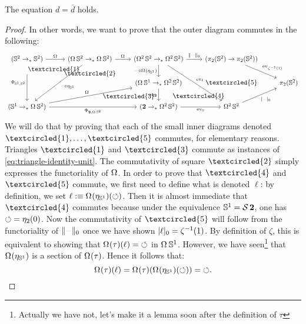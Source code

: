 \documentclass[english,a4]{article}
\newcommand{\ptdto}{\to_\ast}%
\newcommand{\setTrunc}[1]{\Trunc{#1}_0}
\newcommand{\settrunc}[1]{\trunc{#1}_0}
\begin{document}
\begin{proposition}
  The equation $d=\bar d$ holds.
  \label{prop:alternative-description-degree}
\end{proposition}
\begin{proof}
  In other words, we want to prove that the outer diagram commutes in the following:
  \begin{displaymath}
    \begin{tikzcd}
      (\Sp \ptdto \Sp) \ar[r,"\loopspace\null"] \ar[dd,"\Phi_{\Sc,\Sp}"{swap}]
      \drar[phantom,"\textcircled{\small 1}"{description, near start}] 
      & (\loopspace \null \Sp \ptdto \loopspace\null\Sp) \ar[r,"\loopspace\null"] \ar[ddl,"\blank\circ\eta_{\Sc}"] 
      \dar["\textcircled{\small 2}", phantom]
      & (\loopspace 2 \Sp \ptdto \loopspace 2 \Sp) \ar[ddr,"\ev_\ell"] 
      \ar[r,"\setTrunc\blank"] \dar["\blank\circ \loopspace\null(\eta_{\Sc})"swap] 
      & (\pi_2(\Sp) \to \pi_2(\Sp)) \drar["\ev_{\inv\zeta(1)}"] \ar[dd,"\textcircled{\small 5}", phantom] &
      \\
      & {} \drar["\textcircled{\small 3}"{near end}, phantom] 
      & (\loopspace\null\Sc \ptdto \loopspace 2 \Sp) \dar["\blank\circ\eta_{\bn 2}"swap] 
      \drar["\textcircled{\small 4}", phantom] &
      & \pi_2(\Sp)
      \\
      (\Sc \ptdto \loopspace\null\Sp) \ar[rr,"\Phi_{\bn 2,\loopspace\null\Sp}"swap] \ar[urr,"\loopspace\null"] & 
      & (\bn 2 \ptdto \loopspace 2 \Sp) \rar["\ev_0"swap] & \loopspace 2 \Sp \urar["\settrunc\blank"swap] & 
    \end{tikzcd}
  \end{displaymath}
  We will do that by proving that each of the small inner diagrams denoted
  $\textcircled{\small 1},\dots,\textcircled{\small 5}$ commutes, for
  elementary reasons. Triangles $\textcircled{\small 1}$ and
  $\textcircled{\small 3}$ commute as instances of
  \cref{eq:triangle-identity-unit}. The commutativity of square
  $\textcircled{\small 2}$ simply expresses the functoriality of
  $\loopspace\null$. In order to prove that $\textcircled{\small 4}$ and
  $\textcircled{\small 5}$ commute, we first need to define what is denoted
  $\ell$: by definition, we set $\ell \defequi \loopspace\null (\eta_\Sc)(\Sloop)$.
  Then it is almost immediate that $\textcircled{\small 4}$ commutes because
  under the equivalence ${{\mathbb S^{1}}} = \operatorname{\mathcal S} {\mathbf{2}}$, one has $\mathord{\circlearrowleft} = \eta_2(0)$.
  Now the commutativity of $\textcircled{\small 5}$ will follow from the
  functoriality of $\setTrunc\blank$ once we have shown $\settrunc \ell =
  \inv\zeta(1)$. By definition of $\zeta$, this is equivalent to showing that
  $\loopspace\null(\tau) (\ell) = \Sloop$ in $\loopspace\null \Sc$. However, we
  have seen\footnote{\color{red}Actually we have not, let's make it a lemma
  soon after the definition of $\tau$} that $\loopspace\null (\eta_\Sc)$ is a
  section of $\loopspace\null(\tau)$. Hence it follows that:
  \begin{displaymath}
    \loopspace\null(\tau)(\ell) = \loopspace\null(\tau)(\loopspace\null(\eta_\Sc)(\Sloop)) = \Sloop.
  \end{displaymath}
\end{proof}
\end{document}
